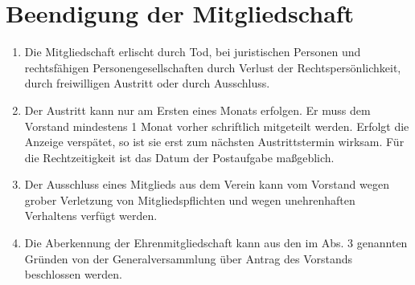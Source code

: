 \documentclass[a4paper,12pt]{article}
\newcommand{\comment}[1]{{\bf /*Komm.:} \textit{#1} {\bf */}}
\def\comment#1{}
\begin{document}





\section{Beendigung der Mitgliedschaft} %
\begin{enumerate}
\item Die Mitgliedschaft erlischt durch Tod, bei juristischen Personen und rechtsfähigen Personengesellschaften durch Verlust der Rechtspersönlichkeit, durch freiwilligen Austritt oder durch Ausschluss.

\item Der Austritt kann nur am Ersten eines Monats erfolgen. Er muss dem Vorstand mindestens 1 Monat vorher schriftlich mitgeteilt werden. Erfolgt die Anzeige verspätet, so ist sie erst zum nächsten Austrittstermin wirksam. Für die Rechtzeitigkeit ist das Datum der Postaufgabe maßgeblich.
\comment{Oder simpler: "Der Austritt kann jederzeit erfolgen. Er muss dem Vorstand schriftlich mitgeteilt werden." }

\item Der Ausschluss eines Mitglieds aus dem Verein kann vom Vorstand wegen grober Verletzung von Mitgliedspflichten und wegen unehrenhaften Verhaltens verfügt werden.
\item Die Aberkennung der Ehrenmitgliedschaft kann aus den im Abs. 3 genannten Gründen von der Generalversammlung über Antrag des Vorstands beschlossen werden.


\end{enumerate}
\end{document}
